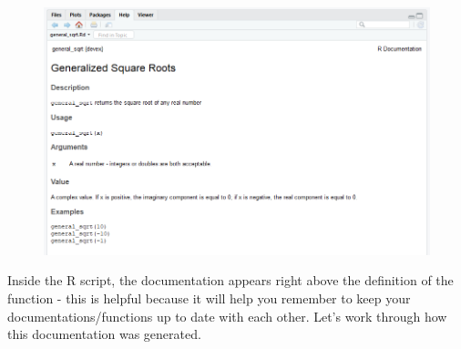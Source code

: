 \documentclass[]{book}
\begin{document}
\begin{figure}
\centering
\includegraphics{images/packageSS/gensqrtdoc.PNG}
\caption{}
\end{figure}

Inside the R script, the documentation appears right above the
definition of the function - this is helpful because it will help you
remember to keep your documentations/functions up to date with each
other. Let's work through how this documentation was generated.
\end{document}
